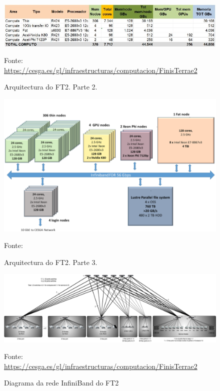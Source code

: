 \begin{figure}
\centerline{\includegraphics[width=15cm]{figuras/FT2_2.jpg}}
\caption{Arquitectura do \gls{FT2}. Parte 2.}
\medskip
\small
\centerline{Fonte: \url{https://cesga.es/gl/infraestructuras/computacion/FinisTerrae2}}
\label{FT2_2}
\end{figure}

\begin{figure}
\centerline{\includegraphics[width=15cm]{figuras/infraFTII.png}}
\caption{Arquitectura do \gls{FT2}. Parte 3.}
\medskip
\small
\centerline{Fonte: \cite{MSO4SC}}
\label{FT2_3}
\end{figure}

\begin{figure}
\centerline{\includegraphics[width=15cm]{figuras/InfiniBand.png}}
\caption{Diagrama da rede InfiniBand do \gls{FT2}}
\medskip
\small
\centerline{Fonte: \url{https://cesga.es/gl/infraestructuras/computacion/FinisTerrae2}}
\label{InfiniBandFigura}
\end{figure}


